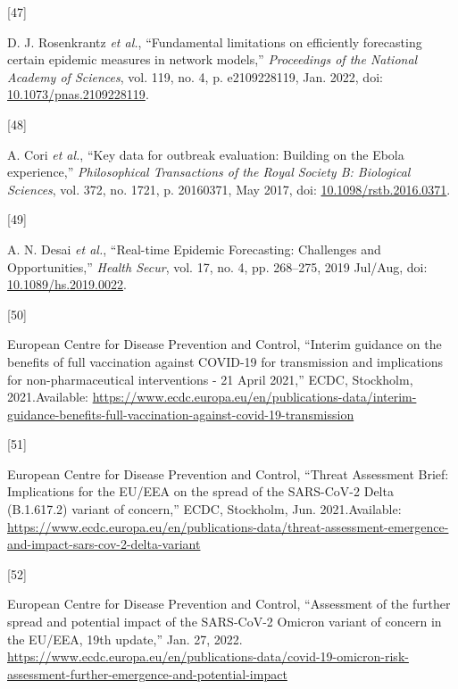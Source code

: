 \documentclass[
]{article}
\newlength{\cslhangindent}
\newlength{\csllabelwidth}
\newlength{\cslentryspacingunit} %
\newenvironment{CSLReferences}[2] %
 {%
  \setlength{\parindent}{0pt}
  \ifodd #1
  \let\oldpar\par
  \def\par{\hangindent=\cslhangindent\oldpar}
  \fi
  \setlength{\parskip}{#2\cslentryspacingunit}
 }%
 {}
\newcommand{\CSLLeftMargin}[1]{\parbox[t]{\csllabelwidth}{#1}}
\newcommand{\CSLRightInline}[1]{\parbox[t]{\linewidth - \csllabelwidth}{#1}\break}
\begin{document}
\begin{CSLReferences}{0}{0}
\leavevmode{}%
\CSLLeftMargin{{[}47{]} }
\CSLRightInline{D. J. Rosenkrantz \emph{et al.}, {``Fundamental
limitations on efficiently forecasting certain epidemic measures in
network models,''} \emph{Proceedings of the National Academy of
Sciences}, vol. 119, no. 4, p. e2109228119, Jan. 2022, doi:
\href{https://doi.org/10.1073/pnas.2109228119}{10.1073/pnas.2109228119}.}

\leavevmode{}%
\CSLLeftMargin{{[}48{]} }
\CSLRightInline{A. Cori \emph{et al.}, {``Key data for outbreak
evaluation: Building on the {Ebola} experience,''} \emph{Philosophical
Transactions of the Royal Society B: Biological Sciences}, vol. 372, no.
1721, p. 20160371, May 2017, doi:
\href{https://doi.org/10.1098/rstb.2016.0371}{10.1098/rstb.2016.0371}.}

\leavevmode{}%
\CSLLeftMargin{{[}49{]} }
\CSLRightInline{A. N. Desai \emph{et al.}, {``Real-time {Epidemic
Forecasting}: {Challenges} and {Opportunities},''} \emph{Health Secur},
vol. 17, no. 4, pp. 268--275, 2019 Jul/Aug, doi:
\href{https://doi.org/10.1089/hs.2019.0022}{10.1089/hs.2019.0022}.}

\leavevmode{}%
\CSLLeftMargin{{[}50{]} }
\CSLRightInline{European Centre for Disease Prevention and Control,
{``Interim guidance on the benefits of full vaccination against
{COVID-19} for transmission and implications for non-pharmaceutical
interventions - 21 {April} 2021,''} {ECDC}, {Stockholm}, 2021.Available:
\url{https://www.ecdc.europa.eu/en/publications-data/interim-guidance-benefits-full-vaccination-against-covid-19-transmission}}

\leavevmode{}%
\CSLLeftMargin{{[}51{]} }
\CSLRightInline{European Centre for Disease Prevention and Control,
{``Threat {Assessment Brief}: {Implications} for the {EU}/{EEA} on the
spread of the {SARS-CoV-2 Delta} ({B}.1.617.2) variant of concern,''}
{ECDC}, {Stockholm}, Jun. 2021.Available:
\url{https://www.ecdc.europa.eu/en/publications-data/threat-assessment-emergence-and-impact-sars-cov-2-delta-variant}}

\leavevmode{}%
\CSLLeftMargin{{[}52{]} }
\CSLRightInline{European Centre for Disease Prevention and Control,
{``Assessment of the further spread and potential impact of the
{SARS-CoV-2 Omicron} variant of concern in the {EU}/{EEA}, 19th
update,''} Jan. 27, 2022.
\url{https://www.ecdc.europa.eu/en/publications-data/covid-19-omicron-risk-assessment-further-emergence-and-potential-impact}}

\end{CSLReferences}
\end{document}
